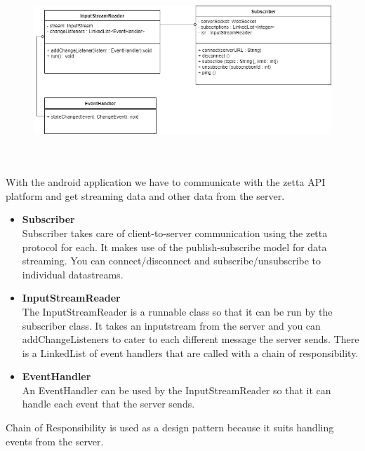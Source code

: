 \begin{center}
\begin{figure}[h]
	\includegraphics[width=15cm, height=7cm]{DataPull/DataPull.png}
\end{figure}
\end{center}
With the android application we have to communicate with the zetta API platform and get streaming data and other data from the server.
\begin{itemize}
	\item \textbf{Subscriber}\\
	Subscriber takes care of client-to-server communication using the zetta protocol for each. It makes use of the publish-subscribe model for data streaming. You can connect/disconnect and subscribe/unsubscribe to individual datastreams.

	\item \textbf{InputStreamReader}\\
	The InputStreamReader is a runnable class so that it can be run by the subscriber class. It takes an inputstream from the server and you can addChangeListeners to cater to each different message the server sends. There is a LinkedList of event handlers that are called with a chain of responsibility.

	\item \textbf{EventHandler}\\
	An EventHandler can be used by the InputStreamReader so that it can handle each event that the server sends.

\end{itemize}
Chain of Responsibility is used as a design pattern because it suits handling events from the server.
